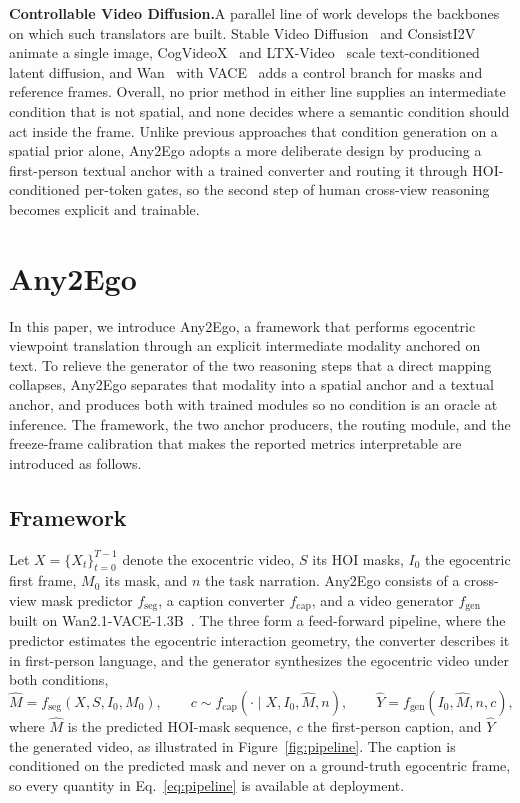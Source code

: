 \documentclass{article}
\begin{document}
\textbf{Controllable Video Diffusion.}\quad A parallel line of work develops the
backbones on which such translators are built. Stable Video
Diffusion~\citep{blattmann2023svd} and ConsistI2V~\citep{ren2024consisti2v}
animate a single image, CogVideoX~\citep{yang2024cogvideox} and
LTX-Video~\citep{hacohen2025ltxvideo} scale text-conditioned latent diffusion, and
Wan~\citep{wan2025} with VACE~\citep{vace2025} adds a control branch for masks and
reference frames. Overall, no prior method in either line supplies an intermediate condition that
is not spatial, and none decides where a semantic condition should act inside the
frame. Unlike
previous approaches that condition generation on a spatial prior alone, Any2Ego
adopts a more deliberate design by producing a first-person textual anchor with
a trained converter and routing it through HOI-conditioned per-token gates, so
the second step of human cross-view reasoning becomes explicit and trainable.

\section{Any2Ego}
\label{sec:method}

In this paper, we introduce Any2Ego, a framework that performs egocentric
viewpoint translation through an explicit intermediate modality anchored on
text. To relieve the generator of the two reasoning steps that a direct mapping
collapses, Any2Ego separates that modality into a spatial anchor and a textual
anchor, and produces both with trained modules so no condition is an
oracle at inference. The framework, the two anchor producers, the
routing module, and the freeze-frame calibration that makes the reported metrics
interpretable are introduced as follows.

\subsection{Framework}
\label{sec:framework}

Let $X=\{X_t\}_{t=0}^{T-1}$ denote the exocentric video, $S$ its HOI masks,
$I_0$ the egocentric first frame, $M_0$ its mask, and $n$ the task narration.
Any2Ego consists of a cross-view mask predictor $f_{\mathrm{seg}}$, a caption
converter $f_{\mathrm{cap}}$, and a video generator $f_{\mathrm{gen}}$ built on
Wan2.1-VACE-1.3B~\citep{wan2025,vace2025}.
The three form a feed-forward pipeline, where the predictor estimates the
egocentric interaction geometry, the converter describes it in first-person
language, and the generator synthesizes the egocentric video under both
conditions,
\begin{equation}
\widehat{M} = f_{\mathrm{seg}}(X,S,I_0,M_0),\qquad
c \sim f_{\mathrm{cap}}(\cdot\mid X,I_0,\widehat{M},n),\qquad
\widehat{Y} = f_{\mathrm{gen}}(I_0,\widehat{M},n,c),
\label{eq:pipeline}
\end{equation}
where $\widehat{M}$ is the predicted HOI-mask sequence, $c$ the first-person
caption, and $\widehat{Y}$ the generated video, as illustrated in
Figure~\ref{fig:pipeline}. The caption is conditioned on
the predicted mask and never on a ground-truth egocentric frame, so every
quantity in Eq.~\ref{eq:pipeline} is available at deployment.
\end{document}
